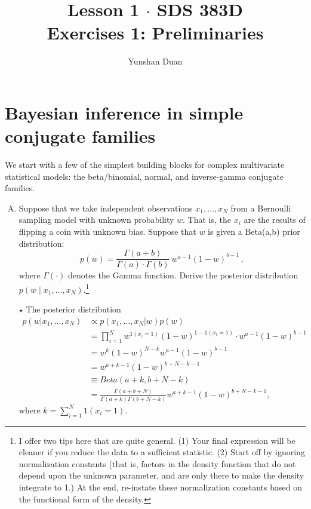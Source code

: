 \documentclass[11pt]{article}
\title{Lesson 1 $\cdot$ SDS 383D \\ Exercises 1: Preliminaries}
\author{Yunshan Duan}
\date{}  %
\newcommand{\jie}{$\star$ }
\begin{document}
\maketitle%

\section{Bayesian inference in simple conjugate families}

We start with a few of the simplest building blocks for complex multivariate statistical models: the beta/binomial, normal, and inverse-gamma conjugate families.

\begin{enumerate}[(A)]

\item Suppose that we take independent observations $x_1, \ldots, x_N$ from a Bernoulli sampling model with unknown probability $w$.  That is, the $x_i$ are the results of flipping a coin with unknown bias.  Suppose that $w$ is given a Beta(a,b) prior distribution:
$$
p(w) = \frac{\Gamma(a+b)}{\Gamma(a) \cdot \Gamma(b)} \ w^{a-1} (1-w)^{b-1} \, ,
$$
where $\Gamma(\cdot)$ denotes the Gamma function.  Derive the posterior distribution $p(w \mid x_1, \ldots, x_N)$.\footnote{I offer two tips here that are quite general.  (1) Your final expression will be cleaner if you reduce the data to a sufficient statistic.  (2) Start off by ignoring normalization constants (that is, factors in the density function that do not depend upon the unknown parameter, and are only there to make the density integrate to 1.)  At the end, re-instate these normalization constants based on the functional form of the density.}

\bigskip

\jie The posterior distribution
\begin{align*}
    p(w | x_1, \dots, x_N) &\propto p(x_1, \dots, x_N|w) p(w) \\
    &= \prod_{i=1}^N w^{1(x_i = 1)} (1-w)^{1-1(x_i=1)} \cdot w^{a-1} (1-w)^{b-1} \\
    &= w^{k} (1-w)^{N-k} w^{a-1} (1-w)^{b-1} \\
    &= w^{a+k-1} (1-w)^{b+N-k-1} \\
    &\equiv Beta(a+k, b+N-k) \\
    &= \frac{\Gamma(a+b+N)}{\Gamma(a+k)\Gamma(b+N-k)} w^{a+k-1} (1-w)^{b+N-k-1},
\end{align*}
where $k = \sum_{i=1}^N 1(x_i=1)$.


\end{enumerate}
\end{document}
